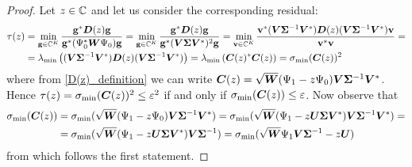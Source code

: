 \begin{proof}
Let $z\in\mathbb{C}$ and let us consider the corresponding residual:
\begin{equation*}
\begin{split}
    \tau(z) &= \min_{\vb{g}\in\mathbb{C}^K} \frac{\vb{g}^*\vb*{D}(z)\vb{g}}{\vb{g}^*(\Psi_0^*\vb*{W}\Psi_0)\vb{g}} = \min_{\vb{g}\in\mathbb{C}^K} \frac{\vb{g}^*\vb*{D}(z)\vb{g}}{\vb{g}^*(\vb*{V}\bm{\Sigma}\vb*{V}^*)^2\vb{g}} =  \min_{\vb{v}\in\mathbb{C}^K} \frac{\vb{v}^*(\vb*{V}\bm{\Sigma}^{-1}\vb*{V}^*)\vb*{D}(z)(\vb*{V}\bm{\Sigma}^{-1}\vb*{V}^*)\vb{v}}{\vb{v}^*\vb{v}} = \\
    &= \lambda_{\min}\left((\vb*{V}\bm{\Sigma}^{-1}\vb*{V}^*)\vb*{D}(z)(\vb*{V}\bm{\Sigma}^{-1}\vb*{V}^*)\right) = \lambda_{\min}\left(\vb*{C}(z)^*\vb*{C}(z)\right) = \sigma_{\min}(\vb*{C}(z))^2
\end{split}
\end{equation*}
where from \eqref{D(z)_definition} we can write $\vb*{C}(z) = \sqrt{\vb*{W}}(\Psi_1 - z\Psi_0)\vb*{V}\bm{\Sigma}^{-1}\vb*{V}^*$. Hence $\tau(z) = \sigma_{\min}(\vb*{C}(z))^2 \leq \varepsilon^2$ if and only if $\sigma_{\min}(\vb*{C}(z)) \leq \varepsilon$. Now observe that
\begin{equation*}
    \begin{split}
        \sigma_{\min}(\vb*{C}(z)) &= \sigma_{\min}(\sqrt{\vb*{W}}(\Psi_1 - z\Psi_0)\vb*{V}\bm{\Sigma}^{-1}\vb*{V}^*) = \sigma_{\min}(\sqrt{\vb*{W}}(\Psi_1 - z\vb*{U}\bm{\Sigma}\vb*{V}^*)\vb*{V}\bm{\Sigma}^{-1}\vb*{V}^*) = \\
        &= \sigma_{\min}(\sqrt{\vb*{W}}(\Psi_1 - z\vb*{U}\bm{\Sigma}\vb*{V}^*)\vb*{V}\bm{\Sigma}^{-1}) = \sigma_{\min}(\sqrt{\vb*{W}}\Psi_1\vb*{V}\bm{\Sigma}^{-1} - z\vb*{U})
    \end{split}
\end{equation*}
from which follows the first statement. 


\end{proof}
